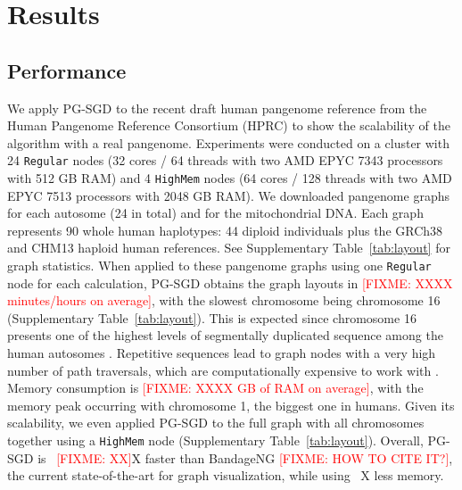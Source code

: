 \documentclass{bioinfo}
\theoremstyle{definition}
\newcommand{\red}[1]{{\textcolor{Red}{#1}}}
\newcommand{\FIXME}[1]{\red{[FIXME: #1]}}
\begin{document}
    \iffalse
    Fig. 1: Describe how our approach works, especially a single update operation (Fig. \ref{fig:sketches}). Explanation of 1D graph updating in Figures \ref{fig:1d_before_update}-\ref{fig:1d_after_update}. Explanation of 2D graph updating in Figures \ref{fig:2d_before_update}-\ref{fig:2d_after_update}. Zipfian distribution.

    
    \fi

    \section{Results}
    \label{sec:results}

    \subsection{Performance}
	We apply PG-SGD to the recent draft human pangenome reference \citep{Liao2023} from the Human Pangenome Reference Consortium (HPRC) to show the scalability of the algorithm with a real pangenome.
	Experiments were conducted on a cluster with 24 \texttt{Regular} nodes (32 cores / 64 threads with two AMD EPYC 7343 processors with 512 GB RAM) and 4 \texttt{HighMem} nodes (64 cores / 128 threads with two AMD EPYC 7513 processors with 2048 GB RAM).
	We downloaded pangenome graphs for each autosome (24 in total) and for the mitochondrial DNA.
	Each graph represents 90 whole human haplotypes: 44 diploid individuals plus the GRCh38 \citep{Schneider2017} and CHM13 \citep{Nurk_2021} haploid human references.
	See Supplementary Table~\ref{tab:layout} for graph statistics.
	When applied to these pangenome graphs using one \texttt{Regular} node for each calculation, PG-SGD obtains the graph layouts in \FIXME{XXXX minutes/hours on average}, with the slowest chromosome being chromosome 16 (Supplementary Table~\ref{tab:layout}).
	This is expected since chromosome 16 presents one of the highest levels of segmentally duplicated sequence among the human autosomes \citep{Martin2004}.
	Repetitive sequences lead to graph nodes with a very high number of path traversals, which are computationally expensive to work with \citep{Guarracino2022}.
	Memory consumption is \FIXME{XXXX GB of RAM on average}, with the memory peak occurring with chromosome 1, the biggest one in humans.
	Given its scalability, we even applied PG-SGD to the full graph with all chromosomes together using a \texttt{HighMem} node (Supplementary Table~\ref{tab:layout}).
	Overall, PG-SGD is ~\FIXME{XX}X faster than BandageNG \FIXME{HOW TO CITE IT?}, the current state-of-the-art for graph visualization, while using ~{}X less memory.
\end{document}
